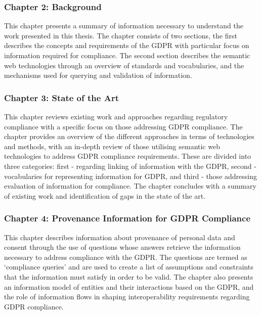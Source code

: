 \subsubsection{Chapter 2: Background}
This chapter presents a summary of information necessary to understand the work presented in this thesis. The chapter consists of two sections, the first describes the concepts and requirements of the GDPR with particular focus on information required for compliance. The second section describes the semantic web technologies through an overview of standards and vocabularies, and the mechanisms used for querying and validation of information.

\subsubsection{Chapter 3: State of the Art}
This chapter reviews existing work and approaches regarding regulatory compliance with a specific focus on those addressing GDPR compliance. The chapter provides an overview of the different approaches in terms of technologies and methods, with an in-depth review of those utilising semantic web technologies to address GDPR compliance requirements. These are divided into three categories: first - regarding linking of information with the GDPR, second - vocabularies for representing information for GDPR, and third - those addressing evaluation of information for compliance. The chapter concludes with a summary of existing work and identification of gaps in the state of the art.

\subsubsection{Chapter 4: Provenance Information for GDPR Compliance}
This chapter describes information about provenance of personal data and consent through the use of questions whose answers retrieve the information necessary to address compliance with the GDPR. The questions are termed as `compliance queries' and are used to create a list of assumptions and constraints that the information must satisfy in order to be valid. The chapter also presents  an information model of entities and their interactions based on the GDPR, and the role of information flows in shaping interoperability requirements regarding GDPR compliance.

